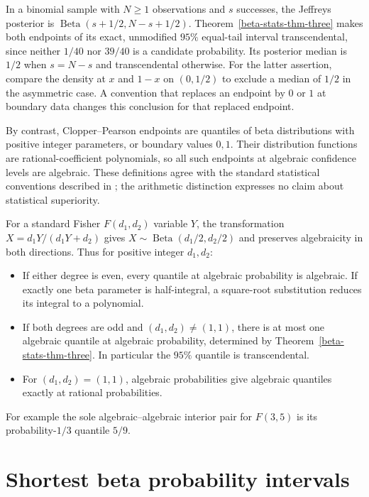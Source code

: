 \documentclass[11pt,a4paper]{article}
\theoremstyle{definition}
\theoremstyle{remark}
\numberwithin{equation}{section}
\begin{document}
In a binomial sample with $N\ge1$ observations and $s$ successes,
the Jeffreys posterior is $\operatorname{Beta}(s+1/2,N-s+1/2)$.
Theorem~\ref{beta-stats-thm-three} makes both endpoints of its exact,
unmodified $95\%$ equal-tail interval transcendental, since neither
$1/40$ nor $39/40$ is a candidate probability. Its posterior median
is $1/2$ when $s=N-s$ and transcendental otherwise. For the latter
assertion, compare the density at $x$ and $1-x$ on $(0,1/2)$ to
exclude a median of $1/2$ in the asymmetric case. A convention that
replaces an endpoint by $0$ or $1$ at boundary data changes this
conclusion for that replaced endpoint.

By contrast, Clopper--Pearson endpoints are quantiles of beta
distributions with positive integer parameters, or boundary values
$0,1$. Their distribution functions are rational-coefficient
polynomials, so all such endpoints at algebraic confidence levels
are algebraic. These definitions agree with the standard statistical
conventions described in \cite{beta-stats-ratesci}; the arithmetic
distinction expresses no claim about statistical superiority.

For a standard Fisher $F(d_1,d_2)$ variable $Y$, the transformation
$X=d_1Y/(d_1Y+d_2)$ gives
$X\sim\operatorname{Beta}(d_1/2,d_2/2)$ and preserves algebraicity
in both directions. Thus for positive integer $d_1,d_2$:
\begin{itemize}
\item If either degree is even, every quantile at algebraic probability
is algebraic. If exactly one beta parameter is half-integral, a
square-root substitution reduces its integral to a polynomial.
\item If both degrees are odd and $(d_1,d_2)\ne(1,1)$, there is at
most one algebraic quantile at algebraic probability, determined by
Theorem~\ref{beta-stats-thm-three}. In particular the $95\%$ quantile
is transcendental.
\item For $(d_1,d_2)=(1,1)$, algebraic probabilities give algebraic
quantiles exactly at rational probabilities.
\end{itemize}
For example the sole algebraic--algebraic interior pair for $F(3,5)$
is its probability-$1/3$ quantile $5/9$.

\section{Shortest beta probability intervals}
\label{beta-stats-sec-hpd}
\end{document}
